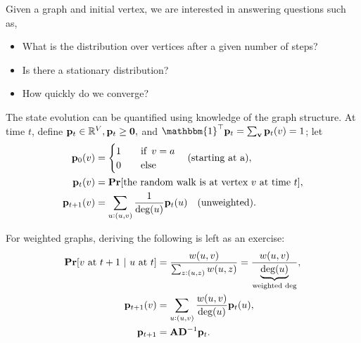 \documentclass[11pt]{article}
\begin{document}
Given a graph and initial vertex, we are interested in answering questions such as,
\begin{itemize}
\item What is the distribution over vertices after a given number of steps?
\item Is there a stationary distribution?
\item How quickly do we converge?
\end{itemize}

The state evolution can be quantified using knowledge of the graph structure. At time $t$, define $\V{p}_t \in \mathbb{R}^V, \V{p}_t \geq \V{0},$ and $\mathbbm{1}^{\top}\V{p}_t = \sum_\V{v}\V{p}_t(v)=1$; let
\begin{align*}
\V{p}_0(v) &= \begin{cases}1 \quad &\text{if} \,\,\, v=a\\0 &\text{else}\end{cases} \quad \text{(starting at a)}, \\
\V{p}_t(v) &= \pr[\text{the random walk is at vertex $v$ at time $t$}], \\
\V{p}_{t+1}(v) &= \sum_{u:(u,v)} \dfrac{1}{\text{deg}(u)}\V{p}_t(u) \quad \text{(unweighted)}.
\end{align*}

For weighted graphs, deriving the following is left as an exercise:
\begin{align*}
\pr[\text{$v$ at $t+1$ $|$ $u$ at $t$}] &= \dfrac{w(u,v)}{\sum_{z:(u,z)}w(u,z)} = \dfrac{w(u,v)}{\underbrace{\text{deg}(u)}_{\footnotesize\text{weighted deg}}}, \\
\V{p}_{t+1}(v) &= \sum_{u:(u,v)} \dfrac{w(u,v)}{\text{deg}(u)}\V{p}_t(u), \\
\V{p}_{t+1} &= \V{A}\V{D}^{-1}\V{p}_t.
\end{align*}
\end{document}
